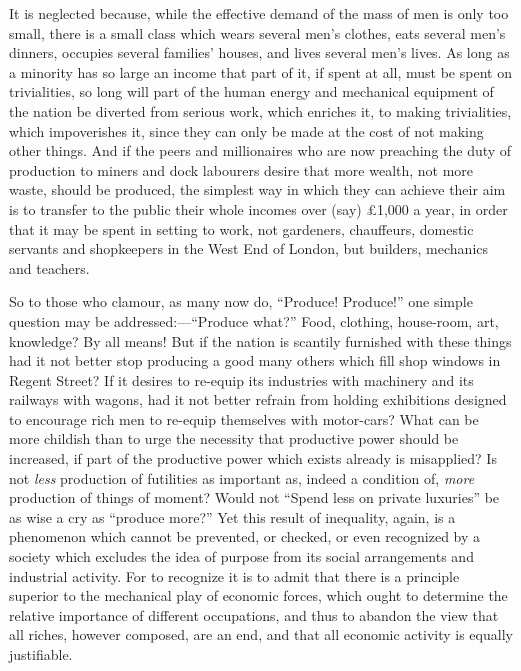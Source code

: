 \documentclass{book}
\begin{document}
It is neglected because, while the effective demand of the mass of men is only too small, there is a small class which wears several men’s clothes, eats several men’s dinners, occupies several families’ houses, and lives several men’s lives. As long as a minority has so large an income that part of it, if spent at all, must be spent on trivialities, so long will part of the human energy and mechanical equipment of the nation be diverted from serious work, which enriches it, to making trivialities, which impoverishes it, since they can only be made at the cost of not making other things. And if the peers and millionaires who are now preaching the duty of production to miners and dock labourers desire that more wealth, not more waste, should be produced, the simplest way in which they can achieve their aim is to transfer to the public their whole incomes over (say) £1,000 a year, in order that it may be spent in setting to work, not gardeners, chauffeurs, domestic servants and shopkeepers in the West End of London, but builders, mechanics and teachers.

So to those who clamour, as many now do, “Produce! Produce!” one simple question may be addressed:—“Produce what?” Food, clothing, house-room, art, knowledge? By all means! But if the nation is scantily furnished with these things had it not better stop producing a good many others which fill shop windows in Regent Street? If it desires to re-equip its industries with machinery and its railways with wagons, had it not better refrain from holding exhibitions designed to encourage rich men to re-equip themselves with motor-cars? What can be more childish than to urge the necessity that productive power should be increased, if part of the productive power which exists already is misapplied? Is not \emph{less} production of futilities as important as, indeed a condition of, \emph{more} production of things of moment? Would not “Spend less on private luxuries” be as wise a cry as “produce more?” Yet this result of inequality, again, is a phenomenon which cannot be prevented, or checked, or even recognized by a society which excludes the idea of purpose from its social arrangements and industrial activity. For to recognize it is to admit that there is a principle superior to the mechanical play of economic forces, which ought to determine the relative importance of different occupations, and thus to abandon the view that all riches, however composed, are an end, and that all economic activity is equally justifiable.
\end{document}
